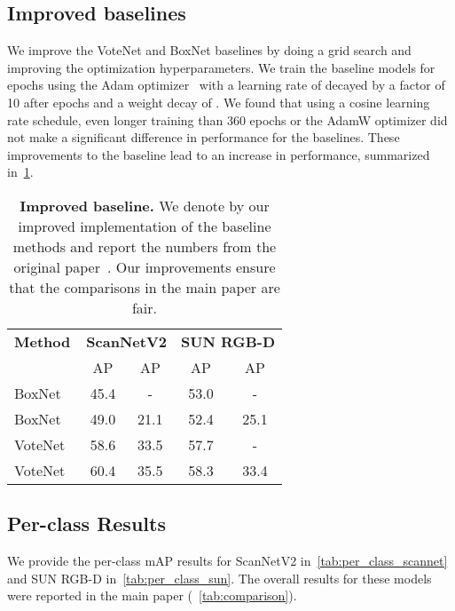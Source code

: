 \documentclass[10pt,twocolumn,letterpaper]{article}
\newcommand{\sunrgbd}{SUN RGB-D\xspace}
\newcommand{\scannet}{ScanNetV2\xspace}
\begin{document}
\subsection{Improved baselines}
We improve the VoteNet and BoxNet baselines by doing a grid search and improving the optimization hyperparameters.
We train the baseline models for  epochs using the Adam optimizer~\cite{KingmaB14} with a learning rate of  decayed by a factor of 10 after  epochs and a weight decay of .
We found that using a cosine learning rate schedule, even longer training than 360 epochs or the AdamW optimizer did not make a significant difference in performance for the baselines.
These improvements to the baseline lead to an increase in performance, summarized in~\cref{tab:improved_baseline}.


\begin{table}[!t]
      \centering
    \begin{tabular}{@{}l|cccc@{}}
    \toprule
    \textbf{Method} & \multicolumn{2}{c}{\textbf{\scannet}} & \multicolumn{2}{c}{\textbf{\sunrgbd}} \\
    &AP & AP & AP & AP \\
    \hline
    BoxNet~\cite{qi2019votenet} & 45.4 & - & 53.0 & - \\
    BoxNet~\cite{qi2019votenet} & 49.0 & 21.1 & 52.4 & 25.1 \\
    \hline
    VoteNet~\cite{qi2019votenet} & 58.6 & 33.5 & 57.7 & - \\
    VoteNet~\cite{qi2019votenet} & 60.4 & 35.5 & 58.3 & 33.4 \\
    \bottomrule
    \end{tabular}
\vspace{-0.1in}
\caption{\textbf{Improved baseline.}
We denote by  our improved implementation of the baseline methods and report the numbers from the original paper~\cite{qi2019votenet}.
Our improvements ensure that the comparisons in the main paper are fair.
}
\label{tab:improved_baseline}
\end{table}

\subsection{Per-class Results}
We provide the per-class mAP results for \scannet in~\cref{tab:per_class_scannet} and \sunrgbd in~\cref{tab:per_class_sun}.
The overall results for these models were reported in the main paper (~\cref{tab:comparison}).
\end{document}
